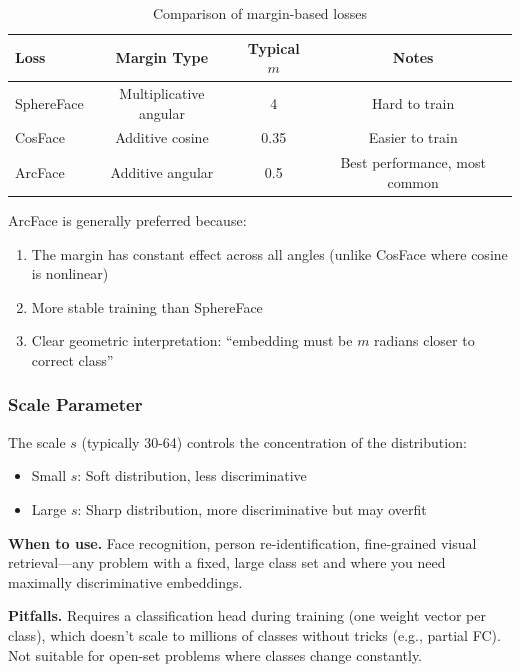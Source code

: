 \begin{table}[H]
\centering
\caption{Comparison of margin-based losses}
\begin{tabular}{lccc}
\toprule
\textbf{Loss} & \textbf{Margin Type} & \textbf{Typical $m$} & \textbf{Notes} \\
\midrule
SphereFace & Multiplicative angular & 4 & Hard to train \\
CosFace & Additive cosine & 0.35 & Easier to train \\
ArcFace & Additive angular & 0.5 & Best performance, most common \\
\bottomrule
\end{tabular}
\end{table}

\begin{keyinsight}
ArcFace is generally preferred because:
\begin{enumerate}
    \item The margin has constant effect across all angles (unlike CosFace where cosine is nonlinear)
    \item More stable training than SphereFace
    \item Clear geometric interpretation: ``embedding must be $m$ radians closer to correct class''
\end{enumerate}
\end{keyinsight}

\subsubsection{Scale Parameter}

The scale $s$ (typically 30-64) controls the concentration of the distribution:
\begin{itemize}
    \item Small $s$: Soft distribution, less discriminative
    \item Large $s$: Sharp distribution, more discriminative but may overfit
\end{itemize}

\textbf{When to use.} Face recognition, person re-identification, fine-grained visual retrieval---any problem with a fixed, large class set and where you need maximally discriminative embeddings.

\textbf{Pitfalls.} Requires a classification head during training (one weight vector per class), which doesn't scale to millions of classes without tricks (e.g., partial FC). Not suitable for open-set problems where classes change constantly.

